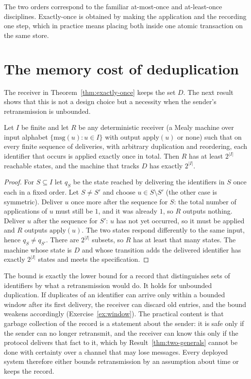 The two orders correspond to the familiar at-most-once and at-least-once disciplines. Exactly-once is obtained by making the application and the recording one step, which in practice means placing both inside one atomic transaction on the same store.

\section{The memory cost of deduplication}

The receiver in Theorem~\ref{thm:exactly-once} keeps the set $D$. The next result shows that this is not a design choice but a necessity when the sender's retransmission is unbounded.

\begin{newresult}\label{thm:dedup-memory}
Let $I$ be finite and let $R$ be any deterministic receiver (a Mealy machine over input alphabet $\{\mathrm{msg}(u):u\in I\}$ with output $\mathrm{apply}(u)$ or none) such that on every finite sequence of deliveries, with arbitrary duplication and reordering, each identifier that occurs is applied exactly once in total. Then $R$ has at least $2^{|I|}$ reachable states, and the machine that tracks $D$ has exactly $2^{|I|}$.
\end{newresult}
\begin{proof}
For $S\subseteq I$ let $q_S$ be the state reached by delivering the identifiers in $S$ once each in a fixed order. Let $S\ne S'$ and choose $u\in S\setminus S'$ (the other case is symmetric). Deliver $u$ once more after the sequence for $S$: the total number of applications of $u$ must still be $1$, and it was already $1$, so $R$ outputs nothing. Deliver $u$ after the sequence for $S'$: $u$ has not yet occurred, so it must be applied and $R$ outputs $\mathrm{apply}(u)$. The two states respond differently to the same input, hence $q_S\ne q_{S'}$. There are $2^{|I|}$ subsets, so $R$ has at least that many states. The machine whose state is $D$ and whose transition adds the delivered identifier has exactly $2^{|I|}$ states and meets the specification.
\end{proof}

The bound is exactly the lower bound for a record that distinguishes sets of identifiers by what a retransmission would do. It holds for unbounded duplication. If duplicates of an identifier can arrive only within a bounded window after its first delivery, the receiver can discard old entries, and the bound weakens accordingly (Exercise~\ref{ex:window}). The practical content is that garbage collection of the record is a statement about the sender: it is safe only if the sender can no longer retransmit, and the receiver can know this only if the protocol delivers that fact to it, which by Result~\ref{thm:two-generals} cannot be done with certainty over a channel that may lose messages. Every deployed system therefore either bounds retransmission by an assumption about time or keeps the record.


